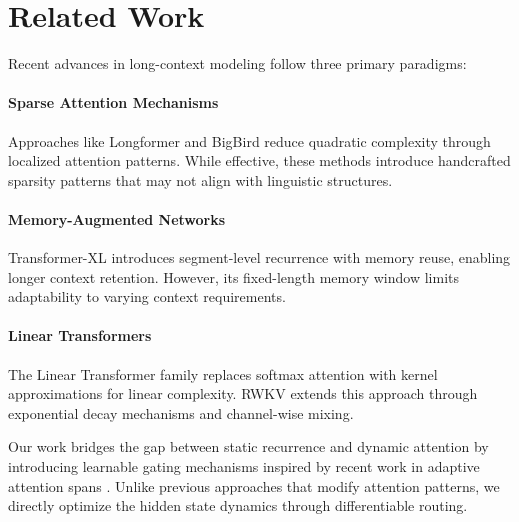 \section{Related Work}
\label{sec:related}
Recent advances in long-context modeling follow three primary paradigms:

\paragraph{Sparse Attention Mechanisms} Approaches like Longformer \cite{beltagy2020longformer} and BigBird \cite{zaheer2020bigbird} reduce quadratic complexity through localized attention patterns. While effective, these methods introduce handcrafted sparsity patterns that may not align with linguistic structures.

\paragraph{Memory-Augmented Networks} Transformer-XL \cite{dai2019transformerxl} introduces segment-level recurrence with memory reuse, enabling longer context retention. However, its fixed-length memory window limits adaptability to varying context requirements.

\paragraph{Linear Transformers} The Linear Transformer family \cite{katharopoulos2020transformers} replaces softmax attention with kernel approximations for linear complexity. RWKV \cite{peng2023rwkv} extends this approach through exponential decay mechanisms and channel-wise mixing.

Our work bridges the gap between static recurrence and dynamic attention by introducing learnable gating mechanisms inspired by recent work in adaptive attention spans \cite{liu2021adaptive}. Unlike previous approaches that modify attention patterns, we directly optimize the hidden state dynamics through differentiable routing.